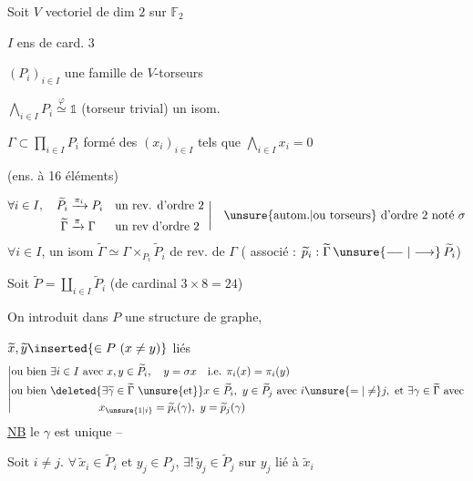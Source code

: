 Soit \(V\) vectoriel de dim \(2\) sur \(\mathbb F_2\)

\(I\) ens de card. \(3\)

\((P_i)_{i\in I}\) une famille de \(V\)-torseurs

\(\bigwedge_{i\in I}P_i\overset{\varphi}{\simeq}\mathbb{1}\) (torseur trivial) un isom.

\(\Gamma\subset\prod_{i\in I}P_i\) formé des \((x_i)_{i\in I}\) tels que \(\bigwedge_{i\in I}x_i=0\)

(ens. à 16 éléments)

\[
 \begin{aligned}
 \forall i\in I,\quad \widetilde P_i&\xrightarrow{\pi_i}P_i&&\text{un rev. d'ordre 2}\\
 \widetilde \Gamma&\xrightarrow{\pi}\Gamma&&\text{un rev d'ordre 2}
 \end{aligned}\ \bigg|\quad\text{\unsure{autom.|ou torseurs} d'ordre 2 noté }\sigma
\]
\(\forall i\in I\), un isom \(\widetilde \Gamma\simeq \Gamma\times_{P_i}\widetilde P_i\) de rev. de \(\Gamma\) ( associé : \(\widetilde p_i:\widetilde \Gamma\,\unsure{\relbar\joinrel\relbar|\longrightarrow}\,\widetilde P_i\))

Soit \(\widetilde P=\coprod_{i\in I}\widetilde P_i\) (de cardinal \(3\times8=24\))

On introduit dans \(P\) une structure de graphe,

\(\widetilde x,\widetilde y\inserted{\in P\ (x\ne y)}\) liés 
\[
 \left|\begin{aligned}
 &\text{ou bien }\exists i\in I\text{ avec }x,y\in\widetilde P_i,\quad y=\sigma x\quad\text{i.e. }\pi_i(x)=\pi_i(y)\\
 &\text{ou bien }\deleted{\exists\widetilde \gamma\in\widetilde \Gamma\ \unsure{\text{et}}}
 x\in\widetilde P_i,\ y\in\widetilde P_j\text{ avec }i\unsure{=|\ne} j,\text{ et }\exists \gamma\in\widetilde \Gamma\text{ avec}\\
 &\hspace{8em}x_{\unsure{1|i}}=\widetilde p_i(\gamma),\ y=\widetilde p_j(\gamma)
 \end{aligned}\right.
\]
\uline{NB} le \(\gamma\) est unique -- 


Soit \(i\ne j\).  \(\forall\,\widetilde x_i\in\widetilde P_i\) et  \(y_j\in P_j\), \(\exists!\,\widetilde y_j\in\widetilde P_j\) sur \(y_j\) lié à \(\widetilde x_i\)

